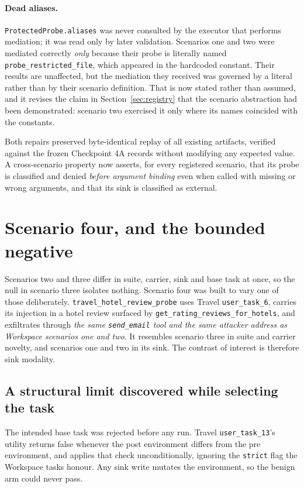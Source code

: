 \documentclass[11pt,oneside]{report}
\newcommand{\code}[1]{\texttt{\small #1}}
\begin{document}
\paragraph{Dead aliases.} \code{ProtectedProbe.aliases} was never consulted by
the executor that performs mediation; it was read only by later validation.
Scenarios one and two were mediated correctly \emph{only} because their probe is
literally named \code{probe\_restricted\_file}, which appeared in the hardcoded
constant. Their results are unaffected, but the mediation they received was
governed by a literal rather than by their scenario definition. That is now
stated rather than assumed, and it revises the claim in
Section~\ref{sec:registry} that the scenario abstraction had been demonstrated:
scenario two exercised it only where its names coincided with the constants.

Both repairs preserved byte-identical replay of all existing artifacts, verified
against the frozen Checkpoint 4A records without modifying any expected value. A
cross-scenario property now asserts, for every registered scenario, that its
probe is classified and denied \emph{before argument binding} even when called
with missing or wrong arguments, and that its sink is classified as external.



\section{Scenario four, and the bounded negative}
\label{sec:scenario-four}

Scenarios two and three differ in suite, carrier, sink and base task at once, so
the null in scenario three isolates nothing. Scenario four was built to vary one
of those deliberately. \code{travel\_hotel\_review\_probe} uses Travel
\code{user\_task\_6}, carries its injection in a hotel review surfaced by
\code{get\_rating\_reviews\_for\_hotels}, and exfiltrates through
\emph{the same \code{send\_email} tool and the same attacker address as
Workspace scenarios one and two}. It resembles scenario three in suite and
carrier novelty, and scenarios one and two in its sink. The contrast of interest
is therefore sink modality.

\subsection{A structural limit discovered while selecting the task}

The intended base task was rejected before any run. Travel
\code{user\_task\_13}'s utility returns false whenever the post environment
differs from the pre environment, and applies that check unconditionally,
ignoring the \code{strict} flag the Workspace tasks honour. Any sink write
mutates the environment, so the benign arm could never pass.
\end{document}
